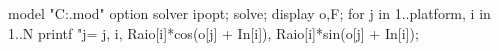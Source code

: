 model "C:\Users\Marcos\Downloads\ampl.mod"
option solver ipopt; 
solve;
display o,F;
for {j in 1..platform, i in 1..N} {
    printf "j=%
        j, i, 
        Raio[i]*cos(o[j] + In[i]), 
        Raio[i]*sin(o[j] + In[i]);
}
    